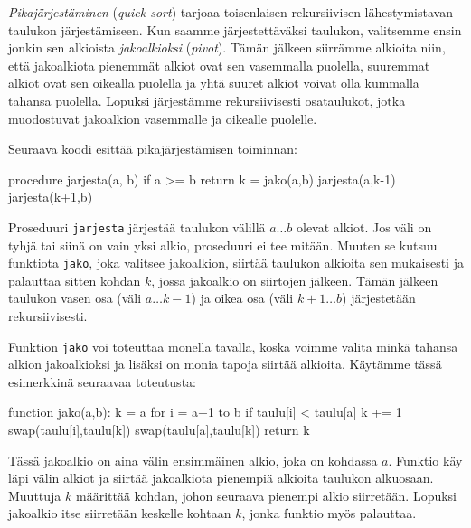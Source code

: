 \emph{Pikajärjestäminen} (\emph{quick sort}) tarjoaa toisenlaisen rekursiivisen
lähestymis\-tavan taulukon järjestämiseen.
Kun saamme järjestettäväksi taulukon, valitsemme ensin jonkin
sen alkioista \emph{jakoalkioksi} (\emph{pivot}).
Tämän jälkeen siirräm\-me alkioita niin,
että jakoalkiota pienemmät alkiot ovat sen vasemmalla puolella,
suuremmat alkiot ovat sen oikealla puolella ja
yhtä suuret alkiot voivat olla kummalla tahansa puolella.
Lopuksi järjestämme rekursiivisesti osataulukot,
jotka muodostuvat jakoalkion vasemmalle ja oikealle puolelle.

Seuraava koodi esittää pikajärjestämisen toiminnan:

\begin{code}
procedure jarjesta(a, b)
    if a >= b
        return
    k = jako(a,b)
    jarjesta(a,k-1)
    jarjesta(k+1,b)
\end{code}

Proseduuri \texttt{jarjesta} järjestää taulukon välillä
$a \dots b$ olevat alkiot.
Jos väli on tyhjä tai siinä on vain yksi alkio,
proseduuri ei tee mitään.
Muuten se kutsuu funktiota \texttt{jako}, joka valitsee jakoalkion,
siirtää taulukon alkioita sen mukaisesti
ja palauttaa sitten kohdan $k$,
jossa jakoalkio on siirtojen jälkeen.
Tämän jälkeen taulukon vasen osa (väli $a \dots k-1$)
ja oikea osa (väli $k+1 \dots b$) järjestetään rekursiivisesti.

Funktion \texttt{jako} voi toteuttaa monella tavalla,
koska voimme valita minkä tahansa alkion jakoalkioksi ja
lisäksi on monia tapoja siirtää alkioita.
Käy\-tämme tässä esimerkkinä seuraavaa toteutusta:

\begin{code}
function jako(a,b):
    k = a
    for i = a+1 to b
        if taulu[i] < taulu[a]
            k += 1
            swap(taulu[i],taulu[k])
    swap(taulu[a],taulu[k])
    return k
\end{code}

Tässä jakoalkio on aina välin ensimmäinen alkio,
joka on kohdassa $a$.
Funktio käy läpi välin alkiot ja siirtää
jakoalkiota pienempiä alkioita taulukon alkuosaan.
Muuttuja $k$ määrittää kohdan,
johon seuraava pienempi alkio siirretään.
Lopuksi jakoalkio itse siirretään keskelle
kohtaan $k$, jonka funktio myös palauttaa.

